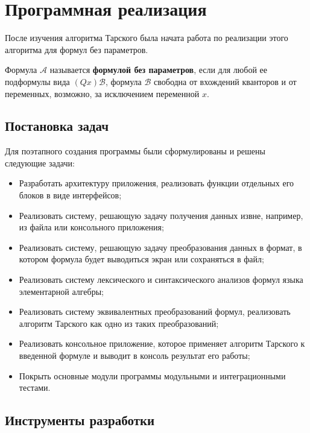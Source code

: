 \section{Программная реализация}

После изучения алгоритма Тарского была начата работа по реализации этого алгоритма для формул без параметров.

\begin{definition}
    Формула $\mathcal{A}$ называется \textbf{формулой без параметров}, если для любой ее подформулы вида $(Qx)\mathcal{B}$, формула $\mathcal{B}$ свободна от вхождений кванторов и от переменных, возможно, за исключением переменной $x$.
\end{definition}

\subsection{Постановка задач}

Для поэтапного создания программы были сформулированы и решены следующие задачи:
\begin{itemize}
    \item Разработать архитектуру приложения, реализовать функции отдельных его блоков в виде интерфейсов;
    \item Реализовать систему, решающую задачу получения данных извне, например, из файла или консольного приложения;
    \item Реализовать систему, решающую задачу преобразования данных в формат, в котором формула будет выводиться экран или сохраняться в файл;
    \item Реализовать систему лексического и синтаксического анализов формул языка элементарной алгебры;
    \item Реализовать систему эквивалентных преобразований формул, реализовать алгоритм Тарского как одно из таких преобразований;
    \item Реализовать консольное приложение, которое применяет алгоритм Тарского к введенной формуле и выводит в консоль результат его работы;
    \item Покрыть основные модули программы модульными и интеграционными тестами.
\end{itemize}

\subsection{Инструменты разработки}

